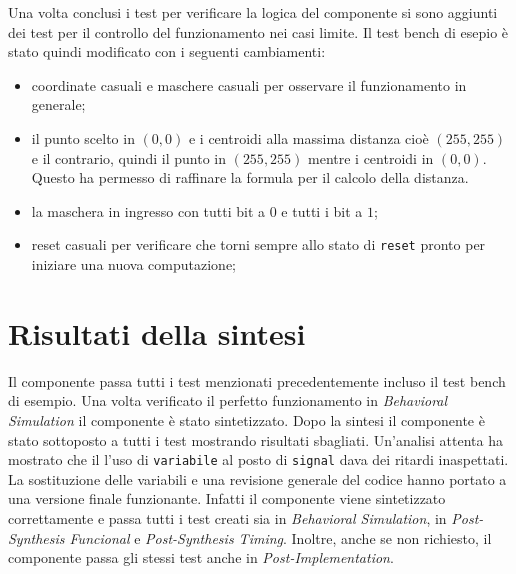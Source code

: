 \documentclass{article}
\begin{document}
Una volta conclusi i test per verificare la logica del componente si sono aggiunti dei test per il controllo del funzionamento nei casi limite. Il test bench di esepio \`{e} stato quindi modificato con i seguenti cambiamenti:
\begin{itemize}
	\item coordinate casuali e maschere casuali per osservare il funzionamento in generale;
	\item il punto scelto in $(0,0)$ e i centroidi alla massima distanza cio\`{e} $(255,255)$ e il contrario, quindi il punto in $(255,255)$ mentre i centroidi in $(0,0)$. Questo ha permesso di raffinare la formula per il calcolo della distanza.
	\item la maschera in ingresso con tutti bit a $0$ e tutti i bit a $1$;
	\item reset casuali per verificare che torni sempre allo stato di \texttt{reset} pronto per iniziare una nuova computazione;	
\end{itemize}




\section{Risultati della sintesi}
Il componente passa tutti i test menzionati precedentemente incluso il test bench di esempio. Una volta verificato il perfetto funzionamento in \textit{Behavioral Simulation} il componente \`{e} stato sintetizzato. Dopo la sintesi il componente \`{e} stato sottoposto a tutti i test mostrando risultati sbagliati. Un'analisi attenta ha mostrato che il l'uso di \texttt{variabile} al posto di \texttt{signal} dava dei ritardi inaspettati. La sostituzione delle variabili e una revisione generale del codice hanno portato a una versione finale funzionante. Infatti il componente viene sintetizzato correttamente e passa tutti i test creati sia in \textit{Behavioral Simulation}, in \textit{Post-Synthesis Funcional} e \textit{Post-Synthesis Timing}. Inoltre, anche se non richiesto, il componente passa gli stessi test anche in \textit{Post-Implementation}.

\pagebreak


 
\pagebreak
\end{document}
